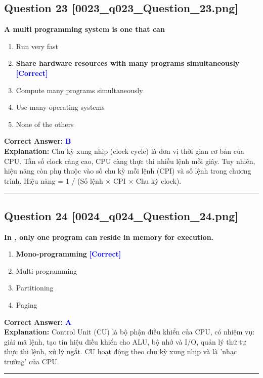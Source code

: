 \documentclass[11pt,a4paper]{article}
\begin{document}
\begin{minipage}{\textwidth}
\subsection*{Question 23 \quad \footnotesize{[0023\_q023\_Question\_23.png]}}
\noindent \textbf{A multi programming system is one that can}

\begin{enumerate}[label=\Alph*.]
    \item Run very fast
    \item \textbf{Share hardware resources with many programs simultaneously} \hfill \textcolor{blue}{\textbf{[Correct]}}
    \item Compute many programs simultaneously
    \item Use many operating systems
    \item None of the others
\end{enumerate}

\noindent \textbf{Correct Answer:} \textcolor{blue}{\textbf{B}} \\[2pt]
\noindent \textbf{Explanation:} Chu kỳ xung nhịp (clock cycle) là đơn vị thời gian cơ bản của CPU. Tần số clock càng cao, CPU càng thực thi nhiều lệnh mỗi giây. Tuy nhiên, hiệu năng còn phụ thuộc vào số chu kỳ mỗi lệnh (CPI) và số lệnh trong chương trình. Hiệu năng = 1 / (Số lệnh × CPI × Chu kỳ clock).

\par\vspace{0.3cm}
\hrule
\vspace{0.3cm}
\end{minipage}

\begin{minipage}{\textwidth}
\subsection*{Question 24 \quad \footnotesize{[0024\_q024\_Question\_24.png]}}
\noindent \textbf{In , only one program can reside in memory for execution.}

\begin{enumerate}[label=\Alph*.]
    \item \textbf{Mono-programming} \hfill \textcolor{blue}{\textbf{[Correct]}}
    \item Multi-programming
    \item Partitioning
    \item Paging
\end{enumerate}

\noindent \textbf{Correct Answer:} \textcolor{blue}{\textbf{A}} \\[2pt]
\noindent \textbf{Explanation:} Control Unit (CU) là bộ phận điều khiển của CPU, có nhiệm vụ: giải mã lệnh, tạo tín hiệu điều khiển cho ALU, bộ nhớ và I/O, quản lý thứ tự thực thi lệnh, xử lý ngắt. CU hoạt động theo chu kỳ xung nhịp và là 'nhạc trưởng' của CPU.

\par\vspace{0.3cm}
\hrule
\vspace{0.3cm}
\end{minipage}
\end{document}
